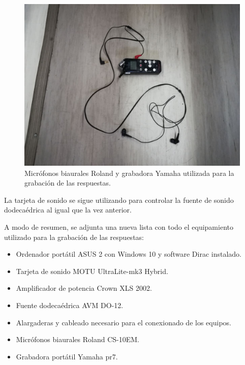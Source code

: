 \documentclass[11pt,a4paper,twoside]{book}
\begin{document}
            \begin{figure}[H]
                \includegraphics[scale=0.3]{../imagenes/MicroBi.jpg}
                \centering
                \caption{Micrófonos biaurales Roland y grabadora Yamaha utilizada para la grabación de las respuestas.}
                \label{fig:microsBi}
            \end{figure}
                
            La tarjeta de sonido se sigue utilizando para controlar la fuente de sonido dodecaédrica al igual que la vez anterior.
                
            A modo de resumen, se adjunta una nueva lista con todo el equipamiento utilizado para la grabación de las respuestas:
                
            \begin{itemize}
                \item Ordenador portátil ASUS 2 con Windows 10 y software Dirac instalado.
	            \item Tarjeta de sonido MOTU UltraLite-mk3 Hybrid.
	            \item Amplificador de potencia Crown XLS 2002.
	            \item Fuente dodecaédrica AVM DO-12.
	            \item Alargaderas y cableado necesario para el conexionado de los equipos.
	            \item Micrófonos biaurales Roland CS-10EM.
	            \item Grabadora portátil Yamaha pr7.
            \end{itemize}
                
\end{document}
